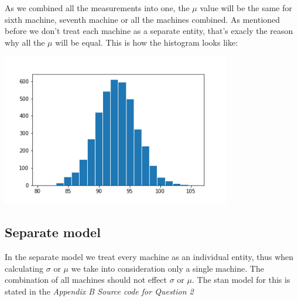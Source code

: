 \documentclass[11pt,a4paper,english]{article}
\begin{document}
          As we combined all the measurements into one, the $\mu$ value will be the same for sixth machine, seventh machine or all the machines combined. As mentioned before we don't treat each machine as a separate entity, that's exacly the reason why all the $\mu$ will be equal. This is how the histogram looks like:
          \begin{center}
            \includegraphics[width=10cm]{pooled_hist_mu.png}
          \end{center}

        \subsection{Separate model}
          In the separate model we treat every machine as an individual entity, thus when calculating $\sigma$ or $\mu$ we take into consideration only a single machine. The combination of all machines should not effect $\sigma$ or $\mu$. The stan model for this is stated in the \textit{Appendix B  Source code for Question 2}
\end{document}
